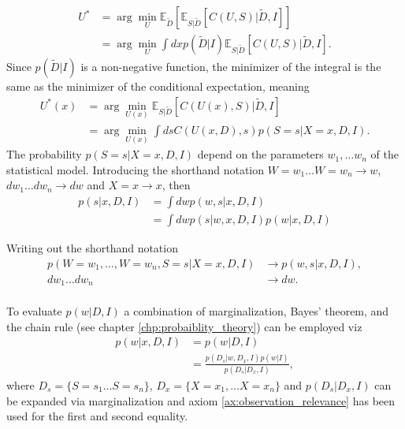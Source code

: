 \begin{equation}
	\begin{split}
		U^* &= \arg\min_{U} \mathbb{E}_{\tilde{D}}[\mathbb{E}_{S|\tilde{D}}[C(U, S)|\tilde{D},I]]\\
		&= \arg\min_{U} \int dxp(\tilde{D}|I) \mathbb{E}_{S|\tilde{D}}[C(U, S)|\tilde{D},I].
	\end{split}
	\label{eq:decision_rule2}
\end{equation}
Since $p(\tilde{D}|I)$ is a non-negative function, the minimizer of the integral is the same as the minimizer of the conditional expectation, meaning
\begin{equation}
	\begin{split}
		U^*(x) &= \arg\min_{U(x)} \mathbb{E}_{S|\tilde{D}}[C(U(x), S)|\tilde{D},I]\\
		& = \arg\min_{U(x)}\int  ds C(U(x,D),s) p(S=s|X=x,D,I).
	\end{split}
	\label{eq:decision_rule3}
\end{equation}
The probability $p(S=s|X=x,D,I)$ depend on the parameters $w_1,\dots w_n$ of the statistical model. Introducing the shorthand notation $W=w_1\dots W=w_n \rightarrow w$, $dw_1\dots dw_n \rightarrow dw$ and $X=x \rightarrow x$, then
\begin{equation}
	\begin{split}
		p(s|x,D,I) &= \int dw p(w,s|x,D,I)\\
		& = \int dw p(s|w,x,D,I)p(w|x,D,I)
	\end{split}
	\label{eq:hest1}
\end{equation}
\begin{example}
	Writing out the shorthand notation
	\begin{equation}
		\begin{split}
			p(W=w_1,\dots,W= w_n,S = s|X = x,D,I)&\rightarrow p(w,s|x,D,I),\\
			dw_1\dots dw_n &\rightarrow dw.\\
		\end{split}
	\end{equation}
\end{example}

To evaluate $p(w|D,I)$ a combination of marginalization, Bayes' theorem, and the chain rule (see chapter \ref{chp:probaiblity_theory}) can be employed viz
\begin{equation}
	\begin{split}
		p(w|x,D,I) &= p(w|D,I)\\
		&= \frac{p(D_s|w,D_x,I)p(w|I)}{p(D_s|D_x,I)},
	\end{split}
	\label{eq:pa2}
\end{equation}
where $D_s= \{S=s_1\dots S=s_n\}$, $D_x = \{X=x_1,\dots X=x_n\}$ and $p(D_s|D_x,I)$ can be expanded via marginalization and axiom \ref{ax:observation_relevance} has been used for the first and second equality.

